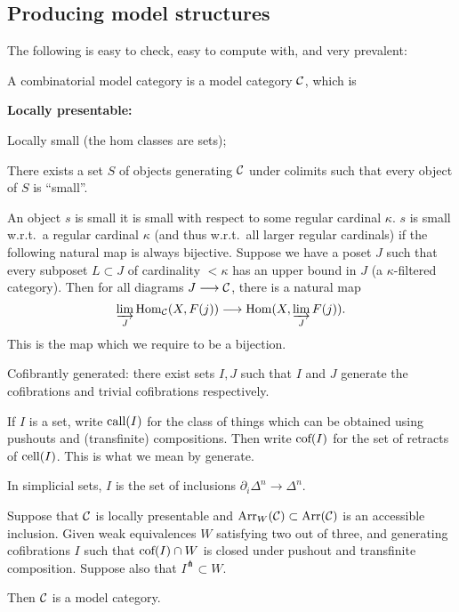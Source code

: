 \documentclass[11pt]{article}
\begin{document}
\begin{JeremyModelPractice}
\subsection*{Producing model structures}
The following is easy to check, easy to compute with, and very prevalent:
\begin{defn*}
A combinatorial model category is a model category $\mathcal{C}$, which is 
\begin{enumerate}\squishlist
\item \textbf{Locally presentable:} 
\begin{itemise}
\item Locally small (the hom classes are sets);
\item There exists a set $S$ of objects generating $\mathcal{C}$ under colimits such that every object of $S$ is ``small''. 
\begin{itemise}
\item An object $s$ is small \Iff it is small with respect to some regular cardinal $\kappa$. $s$ is small w.r.t.\ a regular cardinal $\kappa$ (and thus w.r.t.\ all larger regular cardinals) if the following natural map is always bijective.
Suppose we have a poset $J$ such that every subposet $L\subset J$ of cardinality $<\kappa$ has an upper bound in $J$ (a $\kappa$-filtered category). Then for all diagrams $J\longrightarrow \mathcal{C}$, there is a natural map 
\[\varinjlim_J \operatorname{Hom}_{\mathcal{C}}(X,F(j))\longrightarrow\operatorname{Hom}(X,\varinjlim_J F(j)).\]
This is the map which we require to be a bijection.
\end{itemise}
\end{itemise}
\item Cofibrantly generated: there exist sets $I,J$ such that $I$ and $J$ generate the cofibrations and trivial cofibrations respectively.
\begin{itemise}
\item If $I$ is a set, write $\textup{call}(I)$ for the class of things which can be obtained using pushouts and (transfinite) compositions. Then write $\textup{cof}(I)$ for the set of retracts of $\textup{cell}(I)$. This is what we mean by generate.
\end{itemise}

\end{enumerate}
In simplicial sets, $I$ is the set of inclusions $\partial_i\Delta^n\to \Delta^n$.


\end{defn*}
\begin{thm*}
Suppose that $\mathcal{C}$ is locally presentable and $\textup{Arr}_W(\mathcal{C})\subset\textup{Arr}(\mathcal{C})$ is an accessible inclusion. Given weak equivalences $W$ satisfying two out of three, and generating cofibrations $I$ such that $\textup{cof}(I)\cap W$ is closed under pushout and transfinite composition. Suppose also that $I^\pitchfork\subset W$.

Then $\mathcal{C}$ is a model category.
\end{thm*}

\pagebreak
\end{JeremyModelPractice}
\end{document}
